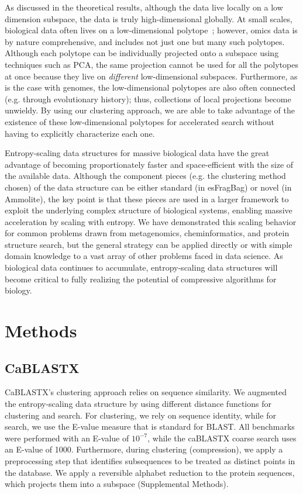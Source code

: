 \documentclass[review,preprint,12pt]{elsarticle}
\renewcommand{\cite}{\citep} %
\theoremstyle{definition}
\theoremstyle{remark}
\numberwithin{equation}{section}
\begin{document}
As discussed in the theoretical results, although the data live locally on a 
low dimension subspace, the data is truly high-dimensional globally.
At small scales, biological data often lives on a low-dimensional polytope~\cite{hart2015inferring}; however, omics data is by nature comprehensive, and includes not just one but many such polytopes.
Although each polytope can be individually projected onto a subspace using techniques such as PCA, the same projection cannot be used for all the polytopes at once because they live on \textit{different} low-dimensional 
subspaces.
Furthermore, as is the case with genomes, the low-dimensional polytopes are also often connected (e.g. through evolutionary history); thus, collections of local projections become unwieldy.
By using our clustering approach, we are able to take advantage of the existence of these low-dimensional polytopes for accelerated search without having to explicitly characterize each one.

Entropy-scaling data structures for massive biological data have the great
advantage of becoming proportionately faster and space-efficient with the
size of the available data.
Although the component pieces (e.g. the clustering method chosen) of the data structure can be either standard (in esFragBag) or novel (in Ammolite), the key point is that these pieces are used in a larger framework to exploit the underlying complex structure of biological systems, enabling massive acceleration by scaling with entropy.
We have demonstrated this scaling behavior for common problems drawn from
metagenomics, cheminformatics, and protein structure search, but the general strategy can be applied
directly or with simple domain knowledge to a vast array of other problems
faced in data science.
As biological data continues to accumulate, entropy-scaling data structures
will become critical to fully realizing the potential of compressive
algorithms for biology. 

\section{Methods}
\subsection{CaBLASTX}
CaBLASTX's clustering approach relies on sequence similarity.
We augmented the entropy-scaling data structure by using
different distance functions for clustering and search.
For clustering, we rely on sequence identity, while for search, we use the
E-value measure that is standard for BLAST.
All benchmarks were performed with an E-value of $10^{-7}$, while the 
caBLASTX coarse search uses an E-value of 1000.
Furthermore, during clustering (compression), we apply a preprocessing step that
identifies subsequences to be treated as distinct points in the database.
We apply a reversible alphabet reduction to the
protein sequences, which projects them into a subspace (Supplemental Methods).
\end{document}
